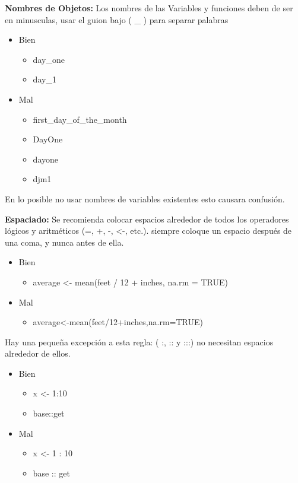 \begin{enumerate}
\textbf{Nombres de Objetos:} Los nombres de las Variables y funciones deben de ser en minusculas, usar el guion bajo ( \_ ) para separar palabras  
\begin{itemize}
\item Bien  
\begin{itemize}
     \item day\_one
     \item day\_1
  \end{itemize}
\item Mal
   \begin{itemize}
      \item first\_day\_of\_the\_month
      \item DayOne
      \item dayone
      \item djm1
    \end{itemize}
 \end{itemize}
En lo posible no usar nombres de variables existentes esto causara confusión.

\textbf{Espaciado:} Se recomienda colocar espacios alrededor de todos los operadores lógicos y aritméticos (=, +, -, \textless-, etc.). siempre coloque un espacio después de una coma, y nunca antes de ella.

\begin{itemize}
\item Bien  
\begin{itemize}
     \item average \textless- mean(feet / 12 + inches, na.rm = TRUE)
  \end{itemize}
\item Mal
   \begin{itemize}
      \item average\textless-mean(feet/12+inches,na.rm=TRUE)
   \end{itemize}
 \end{itemize}
 
Hay una pequeña excepción a esta regla: ( :, :: y :::) no necesitan espacios alrededor de ellos.

\begin{itemize}
\item Bien  
\begin{itemize}
     \item x \textless- 1:10
     \item base::get
  \end{itemize}
\item Mal
   \begin{itemize}
      \item x \textless- 1 : 10
     \item base :: get
   \end{itemize}
 \end{itemize}


\end{enumerate}
